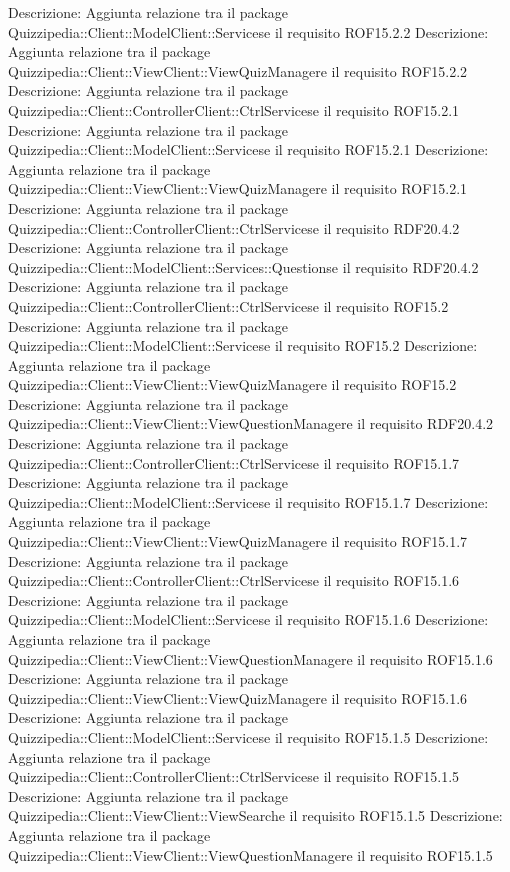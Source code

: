 Descrizione: Aggiunta relazione tra il package Quizzipedia::Client::ModelClient::Servicese il requisito ROF15.2.2 
Descrizione: Aggiunta relazione tra il package Quizzipedia::Client::ViewClient::ViewQuizManagere il requisito ROF15.2.2 
Descrizione: Aggiunta relazione tra il package Quizzipedia::Client::ControllerClient::CtrlServicese il requisito ROF15.2.1 
Descrizione: Aggiunta relazione tra il package Quizzipedia::Client::ModelClient::Servicese il requisito ROF15.2.1 
Descrizione: Aggiunta relazione tra il package Quizzipedia::Client::ViewClient::ViewQuizManagere il requisito ROF15.2.1 
Descrizione: Aggiunta relazione tra il package Quizzipedia::Client::ControllerClient::CtrlServicese il requisito RDF20.4.2 
Descrizione: Aggiunta relazione tra il package Quizzipedia::Client::ModelClient::Services::Questionse il requisito RDF20.4.2 
Descrizione: Aggiunta relazione tra il package Quizzipedia::Client::ControllerClient::CtrlServicese il requisito ROF15.2 
Descrizione: Aggiunta relazione tra il package Quizzipedia::Client::ModelClient::Servicese il requisito ROF15.2 
Descrizione: Aggiunta relazione tra il package Quizzipedia::Client::ViewClient::ViewQuizManagere il requisito ROF15.2 
Descrizione: Aggiunta relazione tra il package Quizzipedia::Client::ViewClient::ViewQuestionManagere il requisito RDF20.4.2 
Descrizione: Aggiunta relazione tra il package Quizzipedia::Client::ControllerClient::CtrlServicese il requisito ROF15.1.7 
Descrizione: Aggiunta relazione tra il package Quizzipedia::Client::ModelClient::Servicese il requisito ROF15.1.7 
Descrizione: Aggiunta relazione tra il package Quizzipedia::Client::ViewClient::ViewQuizManagere il requisito ROF15.1.7 
Descrizione: Aggiunta relazione tra il package Quizzipedia::Client::ControllerClient::CtrlServicese il requisito ROF15.1.6 
Descrizione: Aggiunta relazione tra il package Quizzipedia::Client::ModelClient::Servicese il requisito ROF15.1.6 
Descrizione: Aggiunta relazione tra il package Quizzipedia::Client::ViewClient::ViewQuestionManagere il requisito ROF15.1.6 
Descrizione: Aggiunta relazione tra il package Quizzipedia::Client::ViewClient::ViewQuizManagere il requisito ROF15.1.6 
Descrizione: Aggiunta relazione tra il package Quizzipedia::Client::ModelClient::Servicese il requisito ROF15.1.5 
Descrizione: Aggiunta relazione tra il package Quizzipedia::Client::ControllerClient::CtrlServicese il requisito ROF15.1.5 
Descrizione: Aggiunta relazione tra il package Quizzipedia::Client::ViewClient::ViewSearche il requisito ROF15.1.5 
Descrizione: Aggiunta relazione tra il package Quizzipedia::Client::ViewClient::ViewQuestionManagere il requisito ROF15.1.5 
